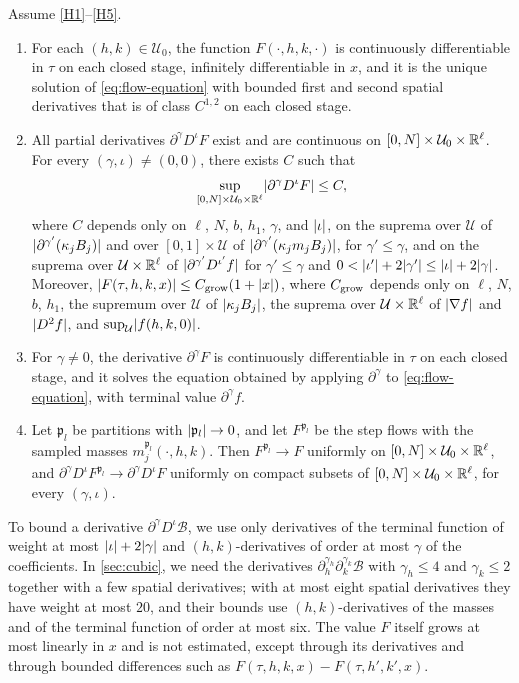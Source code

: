 \begin{proposition}\label{prop:flow-uniform}
Assume \ref{H1}--\ref{H5}.
\begin{enumerate}[label=\textup{(\roman*)}]
\item For each $(h,k)\in\mathcal U_0$, the function $F(\cdot,h,k,\cdot)$ is
 continuously differentiable in $\tau$ on each closed stage, infinitely
 differentiable in $x$, and it is the unique solution of \eqref{eq:flow-equation}
 with bounded first and second spatial derivatives that is of class $C^{1,2}$ on
 each closed stage.
\item All partial derivatives $\partial^\gamma D^\iota F$ exist and are
 continuous on $[0,N]\times\mathcal U_0\times\mathbb R^\ell$. For every
 $(\gamma,\iota)\ne(0,0)$, there exists $C$ such that
 \[
  \sup_{[0,N]\times\mathcal U_0\times\mathbb R^\ell}\lvert \partial^\gamma D^\iota F\rvert\le C,
 \]
 where $C$ depends only on $\ell$, $N$, $b$, $h_1$, $\gamma$, and $\lvert \iota\rvert$,
 on the suprema over $\mathcal U$ of $\lvert \partial^{\gamma'}(\kappa_jB_j)\rvert$ and
 over $[0,1]\times\mathcal U$ of $\lvert \partial^{\gamma'}(\kappa_jm_jB_j)\rvert$, for
 $\gamma'\le\gamma$, and on the suprema over $\mathcal U\times\mathbb R^\ell$ of
 $\lvert \partial^{\gamma'}D^{\iota'}f\rvert$ for $\gamma'\le\gamma$ and
 $0<\lvert \iota'\rvert+2\lvert \gamma'\rvert\le\lvert \iota\rvert+2\lvert \gamma\rvert$.
 Moreover, $\lvert F(\tau,h,k,x)\rvert\le C_{\rm grow}(1+\lvert x\rvert)$, where $C_{\rm grow}$
 depends only on $\ell$, $N$, $b$, $h_1$, the supremum over $\mathcal U$ of
 $\lvert \kappa_jB_j\rvert$, the suprema over $\mathcal U\times\mathbb R^\ell$ of
 $\lvert \nabla f\rvert$ and $\lvert D^2f\rvert$, and $\sup_{\mathcal U}\lvert f(h,k,0)\rvert$.
\item For $\gamma\ne0$, the derivative $\partial^\gamma F$ is continuously
 differentiable in $\tau$ on each closed stage, and it solves the equation
 obtained by applying $\partial^\gamma$ to \eqref{eq:flow-equation}, with
 terminal value $\partial^\gamma f$.
\item Let $\mathfrak p_l$ be partitions with $\lvert \mathfrak p_l\rvert\to0$, and let
 $F^{\mathfrak p_l}$ be the step flows with the sampled masses $m_j^{\mathfrak p_l}(\cdot,h,k)$.
 Then $F^{\mathfrak p_l}\to F$ uniformly on $[0,N]\times\mathcal U_0\times\mathbb R^\ell$, and
 $\partial^\gamma D^\iota F^{\mathfrak p_l}\to\partial^\gamma D^\iota F$ uniformly on compact
 subsets of $[0,N]\times\mathcal U_0\times\mathbb R^\ell$, for every $(\gamma,\iota)$.
\end{enumerate}
\end{proposition}

To bound a derivative $\partial^\gamma D^\iota\mathcal B$, we use only
derivatives of the terminal function of weight at most $\lvert \iota\rvert+2\lvert \gamma\rvert$
and $(h,k)$-derivatives of order at most $\gamma$ of the coefficients. In
\cref{sec:cubic}, we need the derivatives $\partial_h^{\gamma_h}\partial_k^{\gamma_k}\mathcal B$ with
$\gamma_h\le4$ and $\gamma_k\le2$ together with a few spatial derivatives; with at
most eight spatial derivatives they have weight at most $20$, and their bounds
use $(h,k)$-derivatives of the masses and of the terminal function of order at
most six. The value $F$ itself grows at most linearly in $x$ and is
not estimated, except through its derivatives and through bounded differences
such as $F(\tau,h,k,x)-F(\tau,h',k',x)$.

